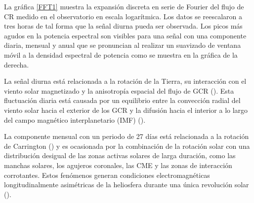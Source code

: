 La gráfica \ref{FFT1} muestra la expansión discreta en serie de Fourier del flujo de CR medido en el observatorio en escala logarítmica. Los datos se reescalaron a tres horas de tal forma que la señal diurna pueda ser observada. Los picos más agudos en la potencia espectral son visibles para una señal con una componente diaria, mensual y anual que se pronuncian al realizar un suavizado de ventana móvil a la densidad espectral de potencia como se muestra en la gráfica de la derecha. 

La señal diurna está relacionada a la rotación de la Tierra, su interacción con el viento solar magnetizado y la anisotropía espacial del flujo de GCR (\cite{noelia_2023}). Esta fluctuación diaria está causada por un equilibrio entre la convección radial del viento solar hacia el exterior de los GCR y la difusión hacia el interior a lo largo del campo magnético interplanetario (IMF) (\cite{martin_ICRC}). 

La componente mensual con un periodo de 27 días está relacionada a la rotación de Carrington (\cite{martin_ICRC}) y es ocasionada por la combinación de la rotación solar con una distribución desigual de las zonas activas solares de larga duración, como las manchas solares, los agujeros coronales, las CME y las zonas de interacción corrotantes. Estos fenómenos generan condiciones electromagnéticas longitudinalmente asimétricas de la heliosfera durante una única revolución solar (\cite{grieder_2001}). 

